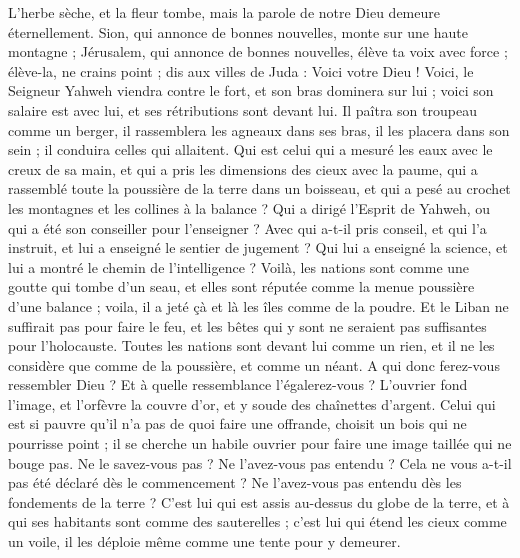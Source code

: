 \begin{multicols}{2}
L'herbe sèche, et la fleur tombe, mais la parole de notre Dieu demeure éternellement.
Sion, qui annonce de bonnes nouvelles, monte sur une haute montagne ; Jérusalem, qui annonce de bonnes nouvelles, élève ta voix avec force ; élève-la, ne crains point ; dis aux villes de Juda : Voici votre Dieu !
Voici, le Seigneur Yahweh viendra contre le fort, et son bras dominera sur lui ; voici son salaire est avec lui, et ses rétributions sont devant lui.
Il paîtra son troupeau comme un berger, il rassemblera les agneaux dans ses bras, il les placera dans son sein ; il conduira celles qui allaitent.
Qui est celui qui a mesuré les eaux avec le creux de sa main, et qui a pris les dimensions des cieux avec la paume, qui a rassemblé toute la poussière de la terre dans un boisseau, et qui a pesé au crochet les montagnes et les collines à la balance ?
Qui a dirigé l'Esprit de Yahweh, ou qui a été son conseiller pour l'enseigner ?
Avec qui a-t-il pris conseil, et qui l'a instruit, et lui a enseigné le sentier de jugement ? Qui lui a enseigné la science, et lui a montré le chemin de l'intelligence ?
Voilà, les nations sont comme une goutte qui tombe d'un seau, et elles sont réputée comme la menue poussière d'une balance ; voila, il a jeté çà et là les îles comme de la poudre.
Et le Liban ne suffirait pas pour faire le feu, et les bêtes qui y sont ne seraient pas suffisantes pour l'holocauste.
Toutes les nations sont devant lui comme un rien, et il ne les considère que comme de la poussière, et comme un néant.
A qui donc ferez-vous ressembler Dieu ? Et à quelle ressemblance l'égalerez-vous ?
L'ouvrier fond l'image, et l'orfèvre la couvre d'or, et y soude des chaînettes d'argent.
Celui qui est si pauvre qu'il n'a pas de quoi faire une offrande, choisit un bois qui ne pourrisse point ; il se cherche un habile ouvrier pour faire une image taillée qui ne bouge pas.
Ne le savez-vous pas ? Ne l'avez-vous pas entendu ? Cela ne vous a-t-il pas été déclaré dès le commencement ? Ne l'avez-vous pas entendu dès les fondements de la terre ?
C'est lui qui est assis au-dessus du globe de la terre, et à qui ses habitants sont comme des sauterelles ; c'est lui qui étend les cieux comme un voile, il les déploie même comme une tente pour y demeurer.

\end{multicols}
